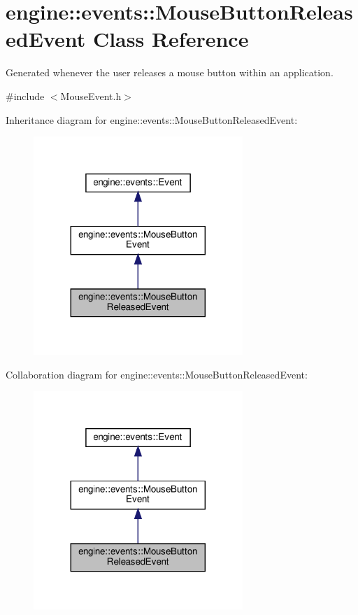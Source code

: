 \hypertarget{classengine_1_1events_1_1MouseButtonReleasedEvent}{}\section{engine\+:\+:events\+:\+:Mouse\+Button\+Released\+Event Class Reference}
\label{classengine_1_1events_1_1MouseButtonReleasedEvent}


Generated whenever the user releases a mouse button within an application.  




{\ttfamily \#include $<$Mouse\+Event.\+h$>$}



Inheritance diagram for engine\+:\+:events\+:\+:Mouse\+Button\+Released\+Event\+:
\nopagebreak
\begin{figure}[H]
\begin{center}
\leavevmode
\includegraphics[width=224pt]{classengine_1_1events_1_1MouseButtonReleasedEvent__inherit__graph}
\end{center}
\end{figure}


Collaboration diagram for engine\+:\+:events\+:\+:Mouse\+Button\+Released\+Event\+:
\nopagebreak
\begin{figure}[H]
\begin{center}
\leavevmode
\includegraphics[width=224pt]{classengine_1_1events_1_1MouseButtonReleasedEvent__coll__graph}
\end{center}
\end{figure}
